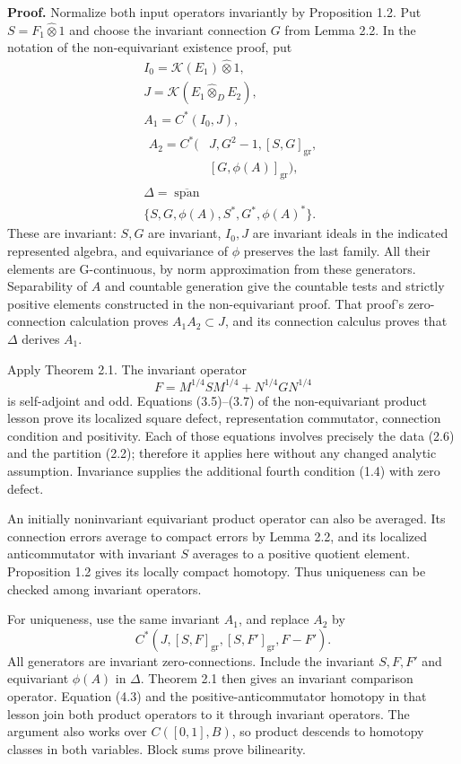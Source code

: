 \documentclass[
  11pt,
]{article}
\begin{document}
\textbf{Proof.} Normalize both input operators invariantly by
Proposition 1.2. Put \(S=F_1\widehat\otimes1\) and choose the invariant
connection \(G\) from Lemma 2.2. In the notation of the non-equivariant
existence proof, put \[
\begin{gathered}
I_0=\mathcal K(E_1)\widehat\otimes1,\\
J=\mathcal K(E_1\widehat\otimes_D E_2),\\
A_1=C^*(I_0,J),\\
\begin{aligned}
A_2=C^*\bigl(&J,G^2-1,[S,G]_{\mathrm{gr}},\\
 &[G,\phi(A)]_{\mathrm{gr}}\bigr),
\end{aligned}\\
\Delta=\overline{\operatorname{span}}\\
\{S,G,\phi(A),S^*,G^*,\phi(A)^*\}.
\end{gathered}
\tag{2.6}
\] These are invariant: \(S,G\) are invariant, \(I_0,J\) are invariant
ideals in the indicated represented algebra, and equivariance of
\(\phi\) preserves the last family. All their elements are G-continuous,
by norm approximation from these generators. Separability of \(A\) and
countable generation give the countable tests and strictly positive
elements constructed in the non-equivariant proof. That proof's
zero-connection calculation proves \(A_1A_2\subset J\), and its
connection calculus proves that \(\Delta\) derives \(A_1\).

Apply Theorem 2.1. The invariant operator \[
F=M^{1/4}SM^{1/4}+N^{1/4}GN^{1/4}
\tag{2.7}
\] is self-adjoint and odd. Equations (3.5)--(3.7) of the
non-equivariant product lesson prove its localized square defect,
representation commutator, connection condition and positivity. Each of
those equations involves precisely the data (2.6) and the partition
(2.2); therefore it applies here without any changed analytic
assumption. Invariance supplies the additional fourth condition (1.4)
with zero defect.

An initially noninvariant equivariant product operator can also be
averaged. Its connection errors average to compact errors by Lemma 2.2,
and its localized anticommutator with invariant \(S\) averages to a
positive quotient element. Proposition 1.2 gives its locally compact
homotopy. Thus uniqueness can be checked among invariant operators.

For uniqueness, use the same invariant \(A_1\), and replace \(A_2\) by
\[
C^*(J,[S,F]_{\mathrm{gr}},[S,F']_{\mathrm{gr}},F-F').
\tag{2.8}
\] All generators are invariant zero-connections. Include the invariant
\(S,F,F'\) and equivariant \(\phi(A)\) in \(\Delta\). Theorem 2.1 then
gives an invariant comparison operator. Equation (4.3) and the
positive-anticommutator homotopy in that lesson join both product
operators to it through invariant operators. The argument also works
over \(C([0,1],B)\), so product descends to homotopy classes in both
variables. Block sums prove bilinearity.
\end{document}
